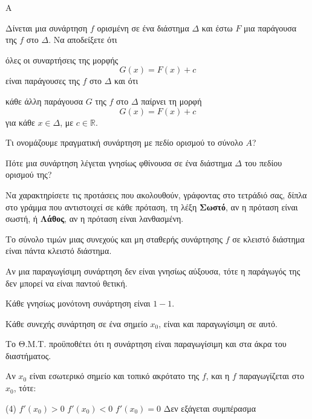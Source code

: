 \begin{thema}{A}
\begin{erwthma}
    \item Δίνεται μια συνάρτηση $ f $ ορισμένη σε ένα διάστημα $ \varDelta $ και έστω $ F $ μια παράγουσα της $ f $ στο $ \varDelta $. Να αποδείξετε ότι \begin{alist} \item όλες οι συναρτήσεις της μορφής \[ G(x)=F(x)+c \] είναι παράγουσες της $ f $ στο $ \varDelta $ και ότι \item κάθε άλλη παράγουσα $ G $ της $ f $ στο $ \varDelta $ παίρνει τη μορφή \[ G(x)=F(x)+c \] για κάθε $ x\in\varDelta $, με $ c\in\mathbb{R} $. \end{alist}
    \item Τι ονομάζουμε πραγματική συνάρτηση με πεδίο ορισμού το σύνολο $A$?
    \item Πότε μια συνάρτηση λέγεται γνησίως φθίνουσα σε ένα διάστημα $\Delta$ του πεδίου ορισμού της?
    \item Να χαρακτηρίσετε τις προτάσεις που ακολουθούν, γράφοντας στο τετράδιό σας, δίπλα στο γράμμα που αντιστοιχεί σε κάθε πρόταση, τη λέξη \textbf{Σωστό}, αν η πρόταση είναι σωστή, ή \textbf{Λάθος}, αν η πρόταση είναι λανθασμένη.
    \begin{alist}
        \item Το σύνολο τιμών μιας συνεχούς και μη σταθερής συνάρτησης $f$ σε κλειστό διάστημα είναι πάντα κλειστό διάστημα.
        \item Αν μια παραγωγίσιμη συνάρτηση δεν είναι γνησίως αύξουσα, τότε η παράγωγός της δεν μπορεί να είναι παντού θετική.
        \item Κάθε γνησίως μονότονη συνάρτηση είναι $1-1$.
        \item Κάθε συνεχής συνάρτηση σε ένα σημείο $x_0$, είναι και παραγωγίσιμη σε αυτό.
        \item Το Θ.Μ.Τ. προϋποθέτει ότι η συνάρτηση είναι παραγωγίσιμη και στα άκρα του διαστήματος.
    \end{alist}
    \item Αν $x_0$ είναι εσωτερικό σημείο και τοπικό ακρότατο της $f$, και η $f$ παραγωγίζεται στο $x_0$, τότε:
    \begin{tasks}[label=\let\textdexiakeraia\relax\alph*.](4)
        \task $f'(x_0) > 0$
        \task $f'(x_0) < 0$
        \task $f'(x_0) = 0$
        \task Δεν εξάγεται συμπέρασμα
    \end{tasks}
\end{erwthma}
\end{thema}
